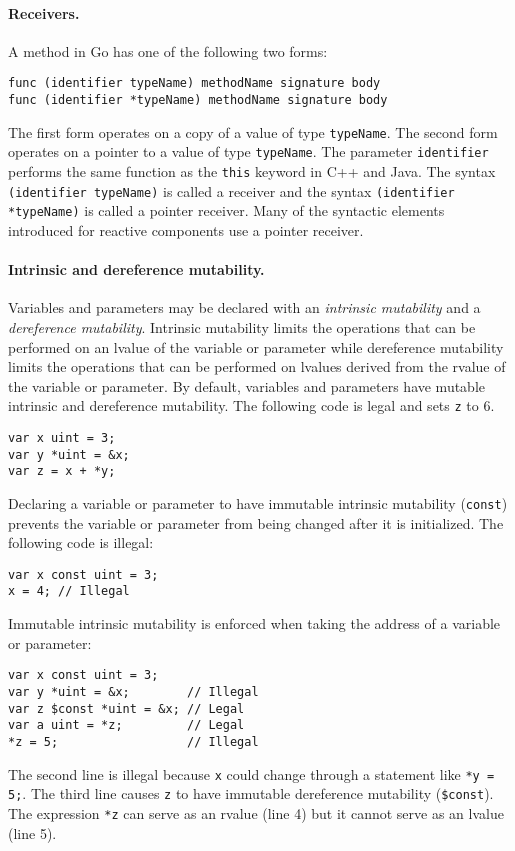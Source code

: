 \paragraph{Receivers.}
A method in Go has one of the following two forms:
\begin{verbatim}
func (identifier typeName) methodName signature body
func (identifier *typeName) methodName signature body
\end{verbatim}
The first form operates on a copy of a value of type \verb+typeName+.
The second form operates on a pointer to a value of type \verb+typeName+.
The parameter \verb+identifier+ performs the same function as the \verb+this+ keyword in C++ and Java.
The syntax \verb+(identifier typeName)+ is called a receiver and the syntax \verb+(identifier *typeName)+ is called a pointer receiver.
Many of the syntactic elements introduced for reactive components use a pointer receiver.

\paragraph{Intrinsic and dereference mutability.}
Variables and parameters may be declared with an \emph{intrinsic mutability} and a \emph{dereference mutability}.
Intrinsic mutability limits the operations that can be performed on an lvalue of the variable or parameter while dereference mutability limits the operations that can be performed on lvalues derived from the rvalue of the variable or parameter.
By default, variables and parameters have mutable intrinsic and dereference mutability.
The following code is legal and sets \verb+z+ to 6.
\begin{verbatim}
var x uint = 3;
var y *uint = &x;
var z = x + *y;
\end{verbatim}

Declaring a variable or parameter to have immutable intrinsic mutability (\verb+const+) prevents the variable or parameter from being changed after it is initialized.
The following code is illegal:
\begin{verbatim}
var x const uint = 3;
x = 4; // Illegal
\end{verbatim}
Immutable intrinsic mutability is enforced when taking the address of a variable or parameter:
\begin{verbatim}
var x const uint = 3;
var y *uint = &x;        // Illegal
var z $const *uint = &x; // Legal
var a uint = *z;         // Legal
*z = 5;                  // Illegal
\end{verbatim}
The second line is illegal because \verb+x+ could change through a statement like \verb+*y = 5;+.
The third line causes \verb+z+ to have immutable dereference mutability (\verb|$const|).
The expression \verb+*z+ can serve as an rvalue (line 4) but it cannot serve as an lvalue (line 5).


